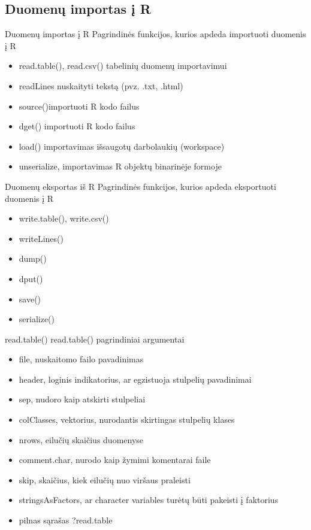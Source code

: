 \documentclass[11pt,xcolor=table]{beamer}
\begin{document}
\subsection{Duomenų importas į R}

\begin{frame}[fragile]{Duomenų importas į R}
Pagrindinės funkcijos, kurios apdeda importuoti duomenis į R
\begin{itemize}
\item read.table(), read.csv() tabelinių duomenų importavimui
\item readLines nuskaityti tekstą (pvz. .txt, .html)
\item source()importuoti R kodo failus
\item dget() importuoti R kodo failus
\item load() importavimas išsaugotų darbolaukių (workspace)
\item unserialize, importavimas R objektų binarinėje formoje
\end{itemize}
\end{frame}


\begin{frame}[fragile]{Duomenų eksportas iš R}
Pagrindinės funkcijos, kurios apdeda eksportuoti duomenis į R
\begin{itemize}
\item write.table(), write.csv()
\item writeLines()
\item dump()
\item dput()
\item save()
\item serialize()
\end{itemize}
\end{frame}


\begin{frame}[fragile]{read.table()}
read.table() pagrindiniai argumentai
\begin{itemize}
\item file, nuskaitomo failo pavadinimas
\item header, loginis indikatorius, ar egzistuoja stulpelių pavadinimai
\item sep, nudoro kaip atskirti stulpeliai
\item colClasses, vektorius, nurodantis skirtingas stulpelių klases
\item nrows, eilučių skaičius duomenyse
\item comment.char, nurodo kaip žymimi komentarai faile
\item skip, skaičius, kiek eilučių nuo viršaus praleisti
\item stringsAsFactors, ar character variables turėtų būti pakeisti į faktorius
\item pilnas sąrašas ?read.table
\end{itemize}
\end{frame}
\end{document}
